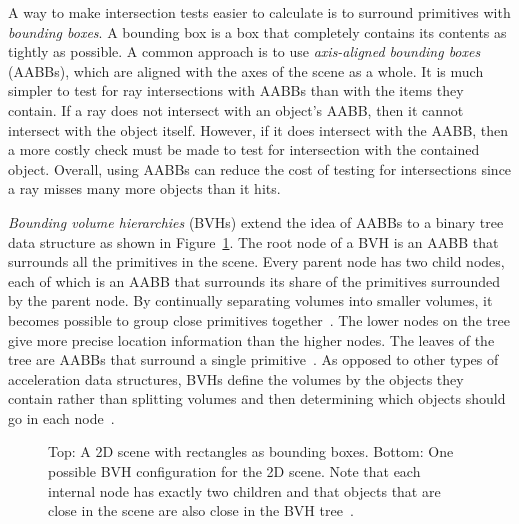 \documentclass{sig-alternate}
\begin{document}
A way to make intersection tests easier to calculate is to surround primitives with \emph{bounding boxes}. A bounding box is a box that completely contains its contents as tightly as possible. A common approach is to use \emph{axis-aligned bounding boxes} (AABBs), which are aligned with the axes of the scene as a whole. It is much simpler to test for ray intersections with AABBs than with the items they contain. If a ray does not intersect with an object's AABB, then it cannot intersect with the object itself. However, if it does intersect with the AABB, then a more costly check must be made to test for intersection with the contained object. Overall, using AABBs can reduce the cost of testing for intersections since a ray misses many more objects than it hits.



\emph{Bounding volume hierarchies} (BVHs) extend the idea of AABBs to a binary tree data structure as shown in Figure~\ref{fig:BVH}. The root node of a BVH is an AABB that surrounds all the primitives in the scene. Every parent node has two child nodes, each of which is an AABB that surrounds its share of the primitives surrounded by the parent node. By continually separating volumes into smaller volumes, it becomes possible to group close primitives together~\cite{Wald:2007}. The lower nodes on the tree give more precise location information than the higher nodes. The leaves of the tree are AABBs that surround a single primitive~\cite{wiki:bvh}. As opposed to other types of acceleration data structures, BVHs define the volumes by the objects they contain rather than splitting volumes and then determining which objects should go in each node~\cite{Wald:2007}.

\begin{figure}[t]
\centering
{}
\caption{Top: A 2D scene with rectangles as bounding boxes. Bottom: One possible BVH configuration for the 2D scene. Note that each internal node has exactly two children and that objects that are close in the scene are also close in the BVH tree~\cite{wiki:bvh}.}
\label{fig:BVH}
\end{figure}
\end{document}

